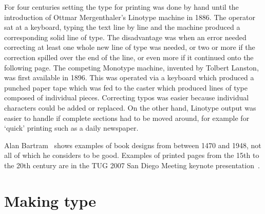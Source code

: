 \documentclass[10pt,a4paper,extrafontsizes]{memoir}
\begin{document}
\begin{paracol}{2}
   For four centuries setting the type for printing was done by hand until 
the introduction of Ottmar Mergenthaler's 
Linotype machine in 1886. The operator
sat at a keyboard, typing the text line by line and the machine produced a 
corresponding solid line of type. The disadvantage was when an error needed
correcting at least one whole new line of type was needed, or two or more if
the correction spilled over the end of the line, or even more if it continued
onto the following page. The competing 
Monotype machine, invented by Tolbert 
Lanston, was first available in 1896. This was operated via a keyboard which
produced a punched paper tape which was fed to the caster which produced
lines of type composed of individual pieces. Correcting typos was easier
because individual characters could be added or replaced. On the other hand,
Linotype output was easier to handle if complete sections had to be moved
around, for example for `quick' printing such as a daily newspaper. 

    Alan Bartram~\autocite{BARTRAM01} shows examples of book designs from between
1470 and 1948, not all of which he considers to be good. Examples of printed
pages from the 15th to the 20th century are in the TUG 2007 San Diego Meeting
keynote presentation~\autocite{TUGKEYNOTE07}.
\end{paracol}

\section{Making type}
\end{document}
